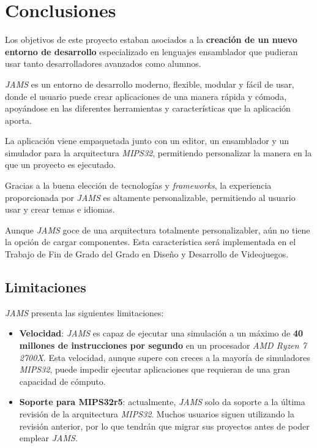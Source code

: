 \chapter{Conclusiones}\label{ch:conclusiones}

Los objetivos de este proyecto estaban asociados a la \textbf{creación
de un nuevo entorno de desarrollo} especializado en lenguajes
ensamblador que pudieran usar tanto desarrolladores avanzados
como alumnos.

\textit{JAMS} es un entorno de desarrollo moderno,
flexible, modular y fácil de usar, donde el usuario puede
crear aplicaciones de una manera rápida y cómoda,
apoyándose en las diferentes herramientas y
características que la aplicación aporta.

La aplicación viene empaquetada junto con un
editor, un ensamblador y un simulador para la arquitectura
\textit{MIPS32}, permitiendo personalizar la manera en la
que un proyecto es ejecutado.

Gracias a la buena elección de tecnologías y
\textit{frameworks}, la experiencia proporcionada por
\textit{JAMS} es altamente personalizable, permitiendo
al usuario usar y crear temas e idiomas.

Aunque \textit{JAMS} goce de una arquitectura
totalmente personalizabler, aún no tiene la opción de cargar componentes.
Esta característica será implementada en el Trabajo de Fin de
Grado del Grado en Diseño y Desarrollo de Videojuegos.

\section{Limitaciones}\label{sec:limitaciones}

\textit{JAMS} presenta las siguientes limitaciones:

\begin{itemize}
    \item \textbf{Velocidad}: \textit{JAMS} es capaz de ejecutar
    una simulación a un máximo de \textbf{40 millones de instrucciones por segundo} en un
    procesador \textit{AMD Ryzen 7 2700X}.
    Esta velocidad, aunque supere con creces a la mayoría de simuladores \textit{MIPS32},
    puede impedir ejecutar aplicaciones que requieran de una gran capacidad de cómputo.
    \item \textbf{Soporte para MIPS32r5}: actualmente, \textit{JAMS} solo da soporte
    a la última revisión de la arquitectura \textit{MIPS32}.
    Muchos usuarios siguen utilizando la revisión anterior, por lo que tendrán que migrar
    sus proyectos antes de poder emplear \textit{JAMS}.
\end{itemize}

